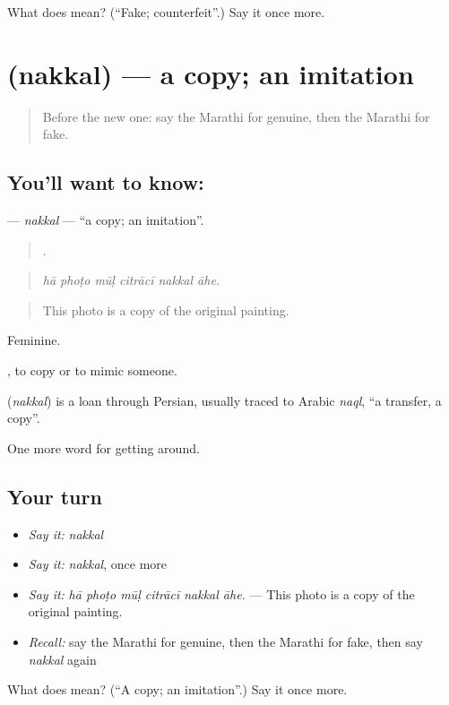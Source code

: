 \begin{tcolorbox}[breakable,colback=teal!4,colframe=teal!35!black,title={Before you move on}]
What does  mean? (\textquotedblleft{}Fake; counterfeit\textquotedblright{}.) Say it once more.
\end{tcolorbox}
\section[\texorpdfstring{\mr{नक्कल} (nakkal)}{नक्कल (nakkal)}]{ (nakkal) — a copy; an imitation}

\label{lesson:MR-C425-nakkal}



\begin{quote}
Before the new one: say the Marathi for genuine, then the Marathi for fake.
\end{quote}

\subsection*{You'll want to know: }
\textbf{} — \emph{nakkal} — \textquotedblleft{}a copy; an imitation\textquotedblright{}.

\begin{quote}
     .
\end{quote}

\begin{quote}
\emph{hā phoṭo mūḷ citrācī nakkal āhe.}
\end{quote}

\begin{quote}
This photo is a copy of the original painting.
\end{quote}

Feminine.

 , to copy or to mimic someone.

\begin{cousinweb}
\textbf{} (\emph{nakkal}) is a loan through Persian, usually traced to Arabic \emph{naql}, \textquotedblleft{}a transfer, a copy\textquotedblright{}.
\end{cousinweb}

\begin{grammarlens}[title={What you've built}]
One more word for getting around.
\end{grammarlens}

\subsection*{Your turn}
\begin{itemize}
\raggedright
  \item \emph{Say it:} \emph{nakkal}
  \item \emph{Say it:} \emph{nakkal}, once more
  \item \emph{Say it:} \emph{hā phoṭo mūḷ citrācī nakkal āhe.} — This photo is a copy of the original painting.
  \item \emph{Recall:} say the Marathi for genuine, then the Marathi for fake, then say \emph{nakkal} again
\end{itemize}

\begin{tcolorbox}[breakable,colback=teal!4,colframe=teal!35!black,title={Before you move on}]
What does  mean? (\textquotedblleft{}A copy; an imitation\textquotedblright{}.) Say it once more.
\end{tcolorbox}
